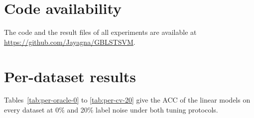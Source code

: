 \documentclass[preprint,12pt]{elsarticle}
\begin{document}
\section*{Code availability}
The code and the result files of all experiments are available at \url{https://github.com/Jayagna/GBLSTSVM}.

\appendix
\section{Per-dataset results}
\label{app:per-dataset}

Tables~\ref{tab:per-oracle-0} to \ref{tab:per-cv-20} give the ACC of the linear models on every dataset at 0\% and 20\% label noise under both tuning protocols.






\clearpage


\end{document}
